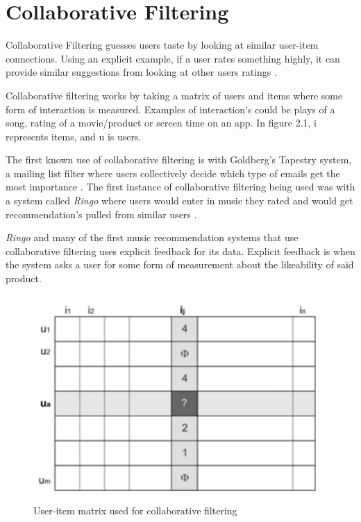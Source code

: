 \section{Collaborative Filtering}

Collaborative Filtering guesses users taste by looking at similar user-item connections. Using an explicit example, if a user rates something highly, it can provide similar suggestions from looking at other users ratings \citep{celma_recommendation_2010}.

Collaborative filtering works by taking a matrix of users and items where some form of interaction is measured. Examples of interaction's could be plays of a song, rating of a movie/product or screen time on an app. In figure 2.1, i represents items, and u is users.

The first known use of collaborative filtering is with Goldberg's Tapestry system, a mailing list filter where users collectively decide which type of emails get the most importance \citep{goldberg_using_1992}. The first instance of collaborative filtering being used was with a system called \textit{Ringo} where users would enter in music they rated and would get recommendation's pulled from similar users \citep{shardanand_social_1995}. 

\textit{Ringo} and many of the first music recommendation systems that use collaborative filtering uses explicit feedback for its data. Explicit feedback is when the system asks a user for some form of measurement about the likeability of said product.

\begin{figure}
\includegraphics[scale=0.65]{images/collaborative_filtering}
\centering
\caption{User-item matrix used for collaborative filtering \citep{celma_recommendation_2010}} 
\label{fig:figure}
\end{figure}

